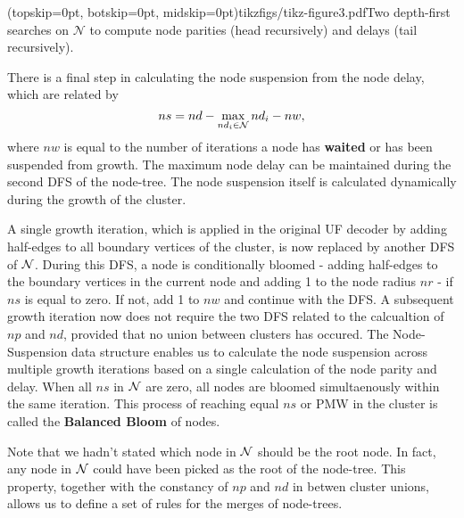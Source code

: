 \Figure[htb](topskip=0pt, botskip=0pt, midskip=0pt){tikzfigs/tikz-figure3.pdf}{Two depth-first searches on $\mathcal{N}$ to compute node parities (head recursively) and delays (tail recursively).\label{fig3}}

There is a final step in calculating the node suspension from the node delay, which are related by
\begin{equation}
    ns = nd - \max_{nd_i \in \mathcal{N}} nd_i - nw, 
\end{equation}
where $nw$ is equal to the number of iterations a node has \textbf{waited} or has been suspended from growth. The maximum node delay can be maintained during the second DFS of the node-tree. The node suspension itself is calculated dynamically during the growth of the cluster. 

A single growth iteration, which is applied in the original UF decoder by adding half-edges to all boundary vertices of the cluster, is now replaced by another DFS of $\mathcal{N}$. During this DFS, a node is conditionally bloomed - adding half-edges to the boundary vertices in the current node and adding 1 to the node radius $nr$ - if $ns$ is equal to zero. If not, add 1 to $nw$ and continue with the DFS. A subsequent growth iteration now does not require the two DFS related to the calcualtion of $np$ and $nd$, provided that no union between clusters has occured. The Node-Suspension data structure enables us to calculate the node suspension across multiple growth iterations based on a single calculation of the node parity and delay. When all $ns$ in $\mathcal{N}$ are zero, all nodes are bloomed simultaenously within the same iteration. This process of reaching equal $ns$ or PMW in the cluster is called the \textbf{Balanced Bloom} of nodes. 

Note that we hadn't stated which node in $\mathcal{N}$ should be the root node. In fact, any node in $\mathcal{N}$ could have been picked as the root of the node-tree. This property, together with the constancy of $np$ and $nd$ in betwen cluster unions, allows us to define a set of rules for the merges of node-trees.  